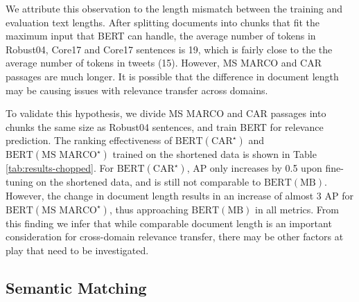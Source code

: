 We attribute this observation to the length mismatch between the training and evaluation text lengths.
After splitting documents into chunks that fit the maximum input that BERT can handle, the average number of tokens in Robust04, Core17 and Core17 sentences is 19, which is fairly close to the the average number of tokens in tweets (15).
However, MS MARCO and CAR passages are much longer.
It is possible that the difference in document length may be causing issues with relevance transfer across domains.

To validate this hypothesis, we divide MS MARCO and CAR passages into chunks the same size as Robust04 sentences, and train BERT for relevance prediction.
The ranking effectiveness of $ \textrm{BERT}(\textrm{CAR}^{\star}) $ and $ \textrm{BERT}(\textrm{MS MARCO}^{\star}) $ trained on the shortened data is shown in Table \ref{tab:results-chopped}.
For $ \textrm{BERT}(\textrm{CAR}^{\star}) $, AP only increases by 0.5 upon fine-tuning on the shortened data, and is still not comparable to $ \textrm{BERT}(\textrm{MB}) $.
However, the change in document length results in an increase of almost 3 AP for $ \textrm{BERT}(\textrm{MS MARCO}^{\star}) $, thus approaching $ \textrm{BERT}(\textrm{MB}) $ in all metrics.
From this finding we infer that while comparable document length is an important consideration for cross-domain relevance transfer, there may be other factors at play that need to be investigated.


\subsection{Semantic Matching}

\begin{table*}[t!]
\centering{}
\caption{Retrieval effectiveness on pruned Robust04.}
\label{tab:results-pruned}
\end{table*}

